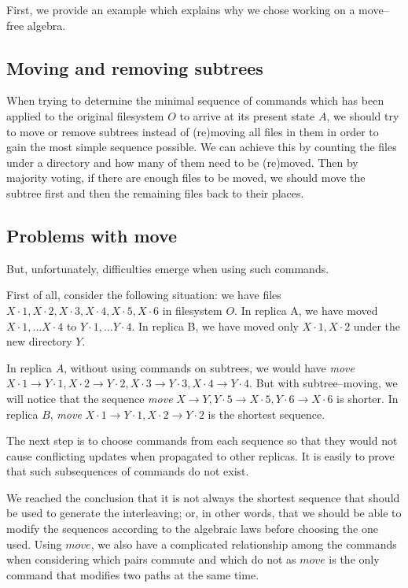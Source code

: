 First, we provide an example which explains why we chose working on
a move--free algebra.

\subsection{Moving and removing subtrees}

When trying to determine the minimal sequence of commands which has been
applied to the original filesystem \(O\) to arrive at its present state
\(A\), we should try to move
or remove subtrees instead of (re)moving all files in them
in order to gain the most simple sequence possible.
We can achieve
this by counting the files under a directory and how many of
them need to be (re)moved. Then by majority voting, if there are enough files to be moved, 
we should move the subtree first and then the remaining files back to their
places.

\subsection{Problems with move}

But, unfortunately, difficulties emerge when using such commands.

First of all, consider the following situation: we have files \(X\cdot1,
X\cdot2, X\cdot3, X\cdot4, X\cdot5, X\cdot6\) in filesystem \(O\). In
replica A, we have moved \(X\cdot1, \ldots X\cdot4\) to \(Y\cdot1, \ldots
Y\cdot4\). In replica B, we have moved only \(X\cdot1, X\cdot2\) under
the new directory \(Y\).

In replica \(A\), without using commands on subtrees, we would
have \emph{move} \(X\cdot1\to Y\cdot1, X\cdot2\to Y\cdot2,
X\cdot3\to Y\cdot3, X\cdot4\to Y\cdot4\). But with subtree--moving,
we will
notice that the sequence \emph{move} \(X\to Y, Y\cdot5\to X\cdot5,
Y\cdot6\to X\cdot6\) is shorter. In replica \(B\), \emph{move}
\(X\cdot1\to Y\cdot1, X\cdot2\to Y\cdot2\) is the shortest sequence.

The next step is to choose commands from each sequence so that they would not
cause conflicting updates when propagated to other replicas.
It is easily to prove that such subsequences of commands
do not exist.
 
We reached the conclusion that it is not always the
shortest sequence that should be used to generate the interleaving; or, in
other words, that we should be able to modify the sequences according to the
algebraic laws before choosing the one used.
Using \(move\), we also have a 
complicated relationship among the commands when considering which pairs
commute and which do not as \(move\) is the only command
that modifies two paths at the same time.

